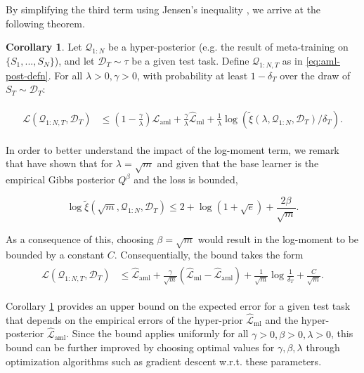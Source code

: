 \documentclass{article} %
\theoremstyle{definition}
\newtheorem{corollary}[theorem]{Corollary}
\begin{document}
By simplifying the third term using Jensen's inequality , we arrive at the following theorem.

\begin{corollary} \label{thm:main-result-gibbs}
	Let $\mathcal{Q}_{1:N}$ be a hyper-posterior (e.g. the result of meta-training on $\{S_1,...,S_N\}$), and let $\mathcal{D}_T\sim \tau$ be a given test task. Define  $\mathcal{Q}_{1:N,T}$ as in \eqref{eq:aml-post-defn}. 
	For all $\lambda>0, \gamma>0$, 
	with probability at least $1-\delta_T$ over the draw of $S_T\sim \mathcal{D}_T$:
	
	\begin{align} \label{eq:pb-adapt-multi}
	\begin{split}
	\mathcal{L}(\mathcal{Q}_{1:N,T}, \mathcal{D}_T) &\leq 
	(1-\frac{\gamma}{\lambda})\hat{\mathcal{L}}_{\mathrm{aml}} + \frac{\gamma}{\lambda}\hat{\mathcal{L}}_{\mathrm{ml}} 
	+\frac{1}{\lambda}\log\left (\tilde{\xi}(\lambda,\mathcal{Q}_{1:N},\mathcal{D}_T)/\delta_T\right ) .
	\end{split}
	\end{align}
\end{corollary}

In order to better understand the impact of the log-moment term, we remark that \citet{Rivasplata2020} have shown that for $\lambda=\sqrt{m}$ and given that the base learner is the empirical Gibbs posterior $Q^\beta$ and the loss is bounded,

$$\log\tilde{\xi}(\sqrt{m},\mathcal{Q}_{1:N},\mathcal{D}_T) \leq 2+\log(1+\sqrt{e})+\frac{2\beta}{\sqrt{m}} .$$

As a consequence of this, choosing $\beta=\sqrt{m}$ would result 
in the log-moment to be bounded by a constant $C$. Consequentially, the bound takes the form
    \begin{align*}
    \begin{split}
    \mathcal{L}(\mathcal{Q}_{1:N,T}, \mathcal{D}_T) &\leq \hat{\mathcal{L}}_{\mathrm{aml}} +
    \frac{\gamma}{\sqrt{m}}(\hat{\mathcal{L}}_{\mathrm{ml}}-\hat{\mathcal{L}}_{\mathrm{aml}}) 
+\frac{1}{\sqrt{m}}\log\frac{1}{\delta_T}+\frac{C}{\sqrt{m}} .
    \end{split}
    \end{align*}


Corollary \ref{thm:main-result-gibbs} provides an upper bound on the expected error for a given test task that depends on the empirical errors of the hyper-prior $\hat{\mathcal{L}}_{\mathrm{ml}}$ and the hyper-posterior $\hat{\mathcal{L}}_{\mathrm{aml}}$. 
Since the bound applies uniformly for all $\gamma>0,\beta>0,\lambda>0$, this bound can be further improved by choosing optimal values for $\gamma, \beta, \lambda$ through optimization algorithms such as gradient descent w.r.t.\! these parameters.
\end{document}
